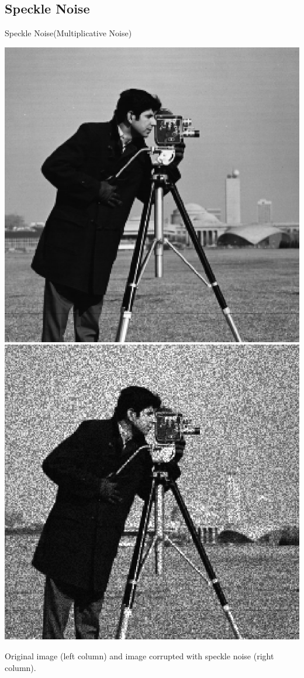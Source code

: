 \documentclass{beamer}
\begin{document}
\subsection{Speckle Noise}
\begin{frame}{Speckle Noise(Multiplicative Noise)}
\begin{center}
  \includegraphics[width=0.4\columnwidth]{images/salt_pepper_origin.jpg}
    \includegraphics[width=0.4\columnwidth]{images/speckle_noise.jpg}
   
    Original image (left column) and image corrupted with speckle noise (right column).
\end{center}

\end{frame}


		
\end{document}
